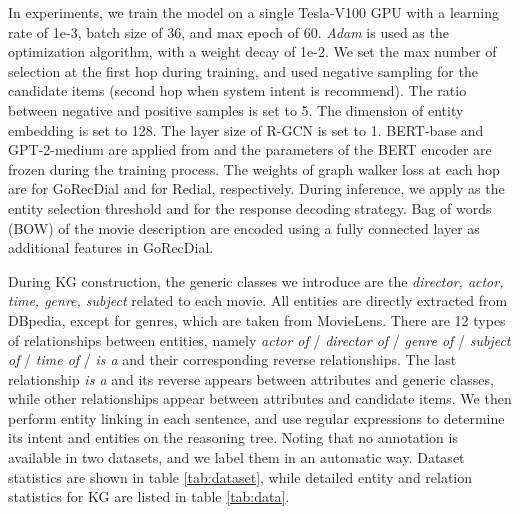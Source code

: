\documentclass[11pt]{article}
\begin{document}
In experiments, we train the model on a single Tesla-V100 GPU with a learning rate of 1e-3, batch size of 36, and max epoch of 60. \textit{Adam} is used as the optimization algorithm, with a weight decay of 1e-2. We set the max number of selection at the first hop  during training, and used negative sampling for the candidate items (second hop when system intent is recommend). The ratio between negative and positive samples is set to 5. The dimension of entity embedding  is set to 128. The layer size of R-GCN  is set to 1. BERT-base and GPT-2-medium are applied from \citet{wolf2020transformers} and the parameters of the BERT encoder are frozen during the training process. The weights of graph walker loss at each hop are  for GoRecDial and  for Redial, respectively. During inference, we apply  as the entity selection threshold and  for the response decoding strategy. Bag of words (BOW) of the movie description are encoded using a fully connected layer as additional features in GoRecDial.

During KG construction, the generic classes we introduce are the \textit{director, actor, time, genre, subject} related to each movie. All entities are directly extracted from DBpedia, except for genres, which are taken from MovieLens. There are 12 types of relationships between entities, namely \textit{actor of} / \textit{director of }/ \textit{genre of} / \textit{subject of} / \textit{time of} / \textit{is a} and their corresponding reverse relationships.  The last relationship \textit{is a} and its reverse appears between attributes and generic classes, while other relationships appear between attributes and candidate items. We then perform entity linking in each sentence, and use regular expressions to determine its intent and entities on the reasoning tree. Noting that no annotation is available in two datasets, and we label them in an automatic way. Dataset statistics are shown in table \ref{tab:dataset}, while detailed entity and relation statistics for KG are listed in table \ref{tab:data}. 
\end{document}
